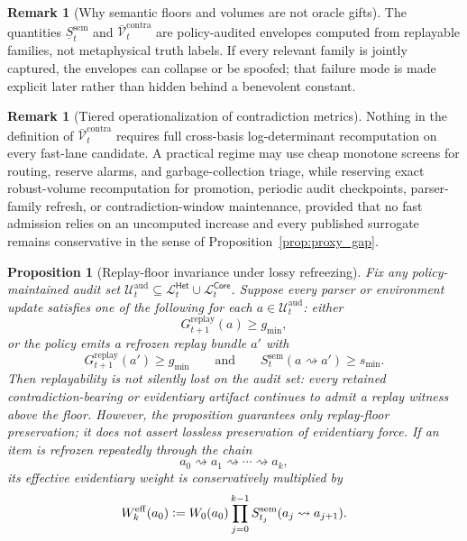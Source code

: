 \documentclass[11pt]{article}
\newtheorem{proposition}[theorem]{Proposition}
\theoremstyle{definition}
\newtheorem{remark}[theorem]{Remark}
\newcommand{\1}{\mathbf{1}}
\newcommand{\Defeq}{\vcentcolon=}
\newcommand{\Core}{\mathsf{Core}}
\newcommand{\Het}{\mathsf{Het}}
\begin{document}
\begin{remark}[Why semantic floors and volumes are not oracle gifts]
The quantities $\underline S_t^{\mathrm{sem}}$ and $\bar{\mathcal V}_t^{\mathrm{contra}}$ are policy-audited envelopes computed from replayable families, not metaphysical truth labels. If every relevant family is jointly captured, the envelopes can collapse or be spoofed; that failure mode is made explicit later rather than hidden behind a benevolent constant.
\end{remark}

\begin{remark}[Tiered operationalization of contradiction metrics]
Nothing in the definition of $\bar{\mathcal V}_t^{\mathrm{contra}}$ requires full cross-basis log-determinant recomputation on every fast-lane candidate. A practical regime may use cheap monotone screens for routing, reserve alarms, and garbage-collection triage, while reserving exact robust-volume recomputation for promotion, periodic audit checkpoints, parser-family refresh, or contradiction-window maintenance, provided that no fast admission relies on an uncomputed increase and every published surrogate remains conservative in the sense of Proposition~\ref{prop:proxy_gap}.
\end{remark}

\begin{proposition}[Replay-floor invariance under lossy refreezing]\label{prop:replay_floor}
Fix any policy-maintained audit set $\mathcal U_t^{\mathrm{aud}}\subseteq \mathcal L_t^{\Het}\cup \mathcal L_t^{\Core}$. Suppose every parser or environment update satisfies one of the following for each $a\in\mathcal U_t^{\mathrm{aud}}$: either
\[
G_{t+1}^{\mathrm{replay}}(a)\ge g_{\min},
\]
or the policy emits a refrozen replay bundle $a'$ with
\[
G_{t+1}^{\mathrm{replay}}(a')\ge g_{\min}
\qquad\text{and}\qquad
S_t^{\mathrm{sem}}(a\rightsquigarrow a')\ge s_{\min}.
\]
Then replayability is not silently lost on the audit set: every retained contradiction-bearing or evidentiary artifact continues to admit a replay witness above the floor. However, the proposition guarantees only \emph{replay-floor preservation}; it does not assert lossless preservation of evidentiary force. If an item is refrozen repeatedly through the chain
\[
a_0\rightsquigarrow a_1\rightsquigarrow \cdots \rightsquigarrow a_k,
\]
its effective evidentiary weight is conservatively multiplied by
\[
W_k^{\mathrm{eff}}(a_0)\Defeq W_0(a_0)\prod_{j=0}^{k-1} S_{t_j}^{\mathrm{sem}}(a_j\rightsquigarrow a_{j+1}).
\]
\end{proposition}
\end{document}
